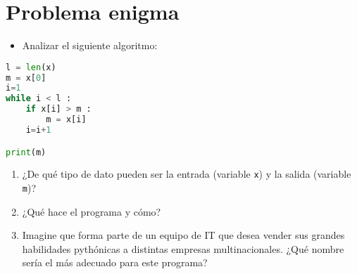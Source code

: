 \documentclass{article}
\begin{document}
\section{Problema enigma}
\begin{itemize}
    \item Analizar el siguiente algoritmo:
\end{itemize}
\begin{lstlisting}[language=Python]
l = len(x)
m = x[0]
i=1
while i < l :
	if x[i] > m :
		m = x[i]
	i=i+1

print(m)

\end{lstlisting}
\begin{enumerate}
    \item ¿De qué tipo de dato pueden ser la entrada (variable \texttt{x}) y la salida (variable \texttt{m})?
    \item ¿Qué hace el programa y cómo?
    \item Imagine que forma parte de un equipo de IT que desea vender sus grandes habilidades pythónicas a distintas empresas multinacionales. ¿Qué nombre sería el más adecuado para este programa?
\end{enumerate}
\end{document}
